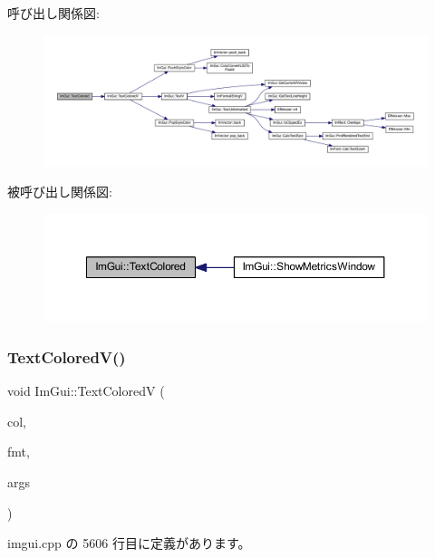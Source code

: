 呼び出し関係図\+:\nopagebreak
\begin{figure}[H]
\begin{center}
\leavevmode
\includegraphics[width=350pt]{namespace_im_gui_a36ab8fcad68b26863d6e910755de04c2_cgraph}
\end{center}
\end{figure}
被呼び出し関係図\+:\nopagebreak
\begin{figure}[H]
\begin{center}
\leavevmode
\includegraphics[width=350pt]{namespace_im_gui_a36ab8fcad68b26863d6e910755de04c2_icgraph}
\end{center}
\end{figure}
\mbox{\label{namespace_im_gui_a87c24ece994188a7145d8feecb4439ed}} 
\subsubsection{\texorpdfstring{Text\+Colored\+V()}{TextColoredV()}}
{\footnotesize\ttfamily void Im\+Gui\+::\+Text\+ColoredV (\begin{DoxyParamCaption}\item[{const \mbox{\hyperlink{struct_im_vec4}{Im\+Vec4}} \&}]{col,  }\item[{const char $\ast$}]{fmt,  }\item[{va\+\_\+list}]{args }\end{DoxyParamCaption})}



 imgui.\+cpp の 5606 行目に定義があります。

